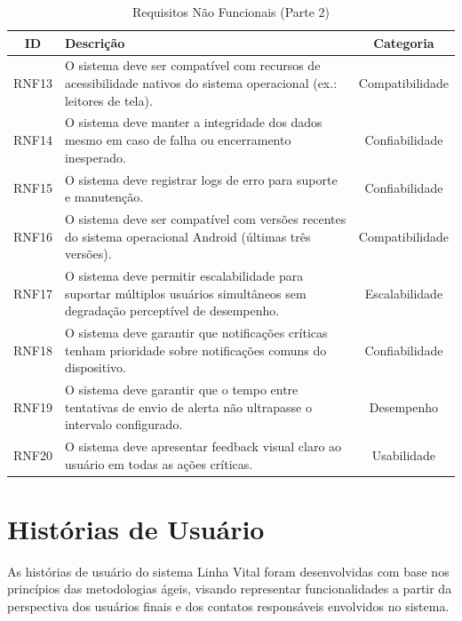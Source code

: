 \begin{table}[H]
\caption{Requisitos Não Funcionais (Parte 2)}
\label{quad_rnf2}
\centering

\begin{tabular}{|c|p{8cm}|c|}
\hline
\textbf{ID} & \textbf{Descrição} & \textbf{Categoria} \\
\hline

RNF13 &
O sistema deve ser compatível com recursos de acessibilidade nativos do sistema operacional (ex.: leitores de tela). &
Compatibilidade \\
\hline

RNF14 &
O sistema deve manter a integridade dos dados mesmo em caso de falha ou encerramento inesperado. &
Confiabilidade \\
\hline

RNF15 &
O sistema deve registrar logs de erro para suporte e manutenção. &
Confiabilidade \\
\hline

RNF16 &
O sistema deve ser compatível com versões recentes do sistema operacional Android (últimas três versões). &
Compatibilidade \\
\hline

RNF17 &
O sistema deve permitir escalabilidade para suportar múltiplos usuários simultâneos sem degradação perceptível de desempenho. &
Escalabilidade \\
\hline

RNF18 &
O sistema deve garantir que notificações críticas tenham prioridade sobre notificações comuns do dispositivo. &
Confiabilidade \\
\hline

RNF19 &
O sistema deve garantir que o tempo entre tentativas de envio de alerta não ultrapasse o intervalo configurado. &
Desempenho \\
\hline

RNF20 &
O sistema deve apresentar feedback visual claro ao usuário em todas as ações críticas. &
Usabilidade \\
\hline

\end{tabular}

\end{table}

\section{Histórias de Usuário}

As histórias de usuário do sistema Linha Vital foram desenvolvidas com base nos princípios das metodologias ágeis, visando representar funcionalidades a partir da perspectiva dos usuários finais e dos contatos responsáveis envolvidos no sistema.

